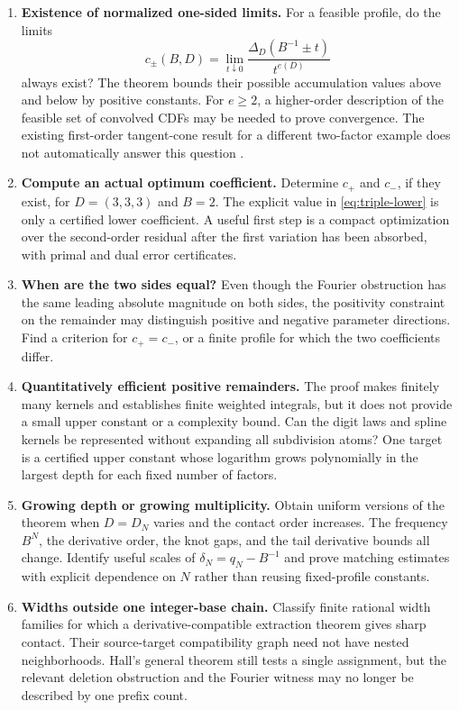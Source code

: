 \documentclass[11pt,letterpaper]{article}
\theoremstyle{definition}
\theoremstyle{remark}
\begin{document}
\begin{enumerate}[label=\textbf{Q\arabic*.},leftmargin=3.5em]
\item \textbf{Existence of normalized one-sided limits.}
For a feasible profile, do the limits
\[
 c_\pm(B,D)=\lim_{t\downarrow0}
       \frac{\Delta_D(B^{-1}\pm t)}{t^{e(D)}}
\]
always exist? The theorem bounds their possible accumulation values above and below by positive constants. For $e\ge2$, a higher-order description of the feasible set of convolved CDFs may be needed to prove convergence. The existing first-order tangent-cone result for a different two-factor example does not automatically answer this question \cite{repo-contact}.

\item \textbf{Compute an actual optimum coefficient.}
Determine $c_+$ and $c_-$, if they exist, for $D=(3,3,3)$ and $B=2$. The explicit value in \eqref{eq:triple-lower} is only a certified lower coefficient. A useful first step is a compact optimization over the second-order residual after the first variation has been absorbed, with primal and dual error certificates.

\item \textbf{When are the two sides equal?}
Even though the Fourier obstruction has the same leading absolute magnitude on both sides, the positivity constraint on the remainder may distinguish positive and negative parameter directions. Find a criterion for $c_+=c_-$, or a finite profile for which the two coefficients differ.

\item \textbf{Quantitatively efficient positive remainders.}
The proof makes finitely many kernels and establishes finite weighted integrals, but it does not provide a small upper constant or a complexity bound. Can the digit laws and spline kernels be represented without expanding all subdivision atoms? One target is a certified upper constant whose logarithm grows polynomially in the largest depth for each fixed number of factors.

\item \textbf{Growing depth or growing multiplicity.}
Obtain uniform versions of the theorem when $D=D_N$ varies and the contact order increases. The frequency $B^N$, the derivative order, the knot gaps, and the tail derivative bounds all change. Identify useful scales of $\delta_N=q_N-B^{-1}$ and prove matching estimates with explicit dependence on $N$ rather than reusing fixed-profile constants.

\item \textbf{Widths outside one integer-base chain.}
Classify finite rational width families for which a derivative-compatible extraction theorem gives sharp contact. Their source-target compatibility graph need not have nested neighborhoods. Hall's general theorem still tests a single assignment, but the relevant deletion obstruction and the Fourier witness may no longer be described by one prefix count.


\end{enumerate}
\end{document}

